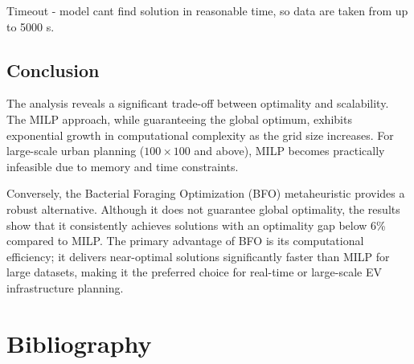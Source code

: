 \documentclass{article}
\begin{document}
Timeout - model cant find solution in reasonable time, so data  are taken from up to 5000 s.

\subsection{Conclusion}
The analysis reveals a significant trade-off between optimality and scalability. The MILP approach, while guaranteeing the global optimum, exhibits exponential growth in computational complexity as the grid size increases. For large-scale urban planning ($100 \times 100$ and above), MILP becomes practically infeasible due to memory and time constraints.

\bigskip
Conversely, the Bacterial Foraging Optimization (BFO) metaheuristic provides a robust alternative. Although it does not guarantee global optimality, the results show that it consistently achieves solutions with an optimality gap below 6\% compared to MILP. The primary advantage of BFO is its computational efficiency; it delivers near-optimal solutions significantly faster than MILP for large datasets, making it the preferred choice for real-time or large-scale EV infrastructure planning.

\cleardoublepage
\section{Bibliography}
\renewcommand{\refname}{\vspace{-2em}}


\end{document}
